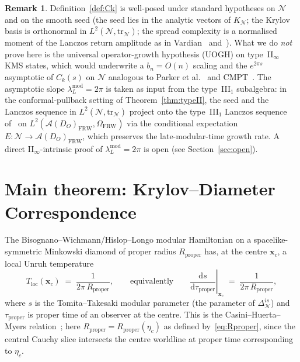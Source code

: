 \documentclass[11pt]{article}
\theoremstyle{definition}
\newtheorem{remark}[theorem]{Remark}
\renewcommand{\AA}{\mathcal{A}}
\newcommand{\NN}{\mathcal{N}}
\newcommand{\FRW}{\mathrm{FRW}}
\newcommand{\Rprop}{R_{\mathrm{proper}}}
\begin{document}
\begin{remark}\label{rem:blockA-status}
Definition~\ref{def:Ck} is well-posed under standard hypotheses on
$\NN$ and on the smooth seed (the seed lies in the analytic vectors
of $K_\NN$; the Krylov basis is orthonormal in
$L^2(\NN, \mathrm{tr}_\NN)$; the spread complexity is a normalised
moment of the Lanczos return amplitude as in Vardian~\cite{CMPT24}
and~\cite{AguilarGutierrez2025}). What we do \emph{not} prove here is
the universal operator-growth hypothesis (UOGH) on type~II$_\infty$
KMS states, which would underwrite a $b_n = O(n)$ scaling and the
$e^{2\pi s}$ asymptotic of $C_k(s)$ on $\NN$ analogous to Parker et
al.~\cite{ParkerEtAl2019} and CMPT~\cite{CMPT24}. The asymptotic
slope $\lambda_L^{\mathrm{mod}}=2\pi$ is taken as input from the
type~III$_1$ subalgebra: in the conformal-pullback setting of
Theorem~\ref{thm:typeII}, the seed and the Lanczos sequence in
$L^2(\NN, \mathrm{tr}_\NN)$ project onto the type~III$_1$ Lanczos
sequence of~\cite{CMPT24} on $L^2(\AA(D_O)_\FRW, \Omega_\FRW)$ via
the conditional expectation $E:\NN\to\AA(D_O)_\FRW$, which preserves
the late-modular-time growth rate. A direct II$_\infty$-intrinsic
proof of $\lambda_L^{\mathrm{mod}} = 2\pi$ is open (see
Section~\ref{sec:open}).
\end{remark}

\section{Main theorem: Krylov--Diameter Correspondence}\label{sec:main}

The Bisognano--Wichmann/Hislop--Longo modular Hamiltonian on a
spacelike-symmetric Minkowski diamond of proper radius $\Rprop$
has, at the centre $\mathbf{x}_c$, a local Unruh temperature
\begin{equation}\label{eq:CHM}
T_{\mathrm{loc}}(\mathbf{x}_c) \;=\; \frac{1}{2\pi\,\Rprop},
\qquad \text{equivalently}\qquad
\left.\frac{\mathrm{d}s}{\mathrm{d}\tau_{\mathrm{proper}}}\right|_{\mathbf{x}_c} \;=\; \frac{1}{2\pi\,\Rprop},
\end{equation}
where $s$ is the Tomita--Takesaki modular parameter (the parameter of
$\Delta_\NN^{is}$) and $\tau_{\mathrm{proper}}$ is proper time of an
observer at the centre. This is the Casini--Huerta--Myers
relation~\cite{CHM2008}; here $\Rprop = \Rprop(\eta_c)$ as
defined by~\eqref{eq:Rproper}, since the central Cauchy slice
intersects the centre worldline at proper time corresponding to
$\eta_c$.
\end{document}
